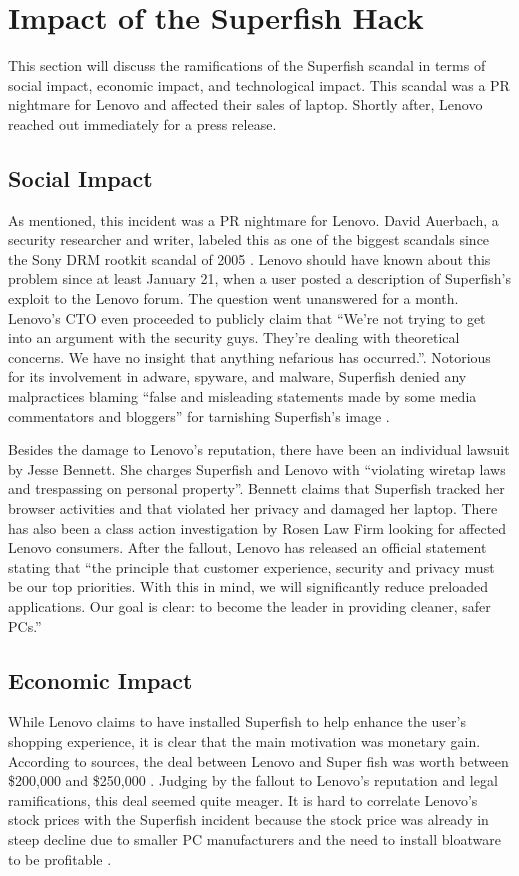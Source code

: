 \documentclass[journal]{IEEEtran}
\begin{document}
\section{Impact of the Superfish Hack}
This section will discuss the ramifications of the Superfish scandal in terms of social impact, economic impact, and technological impact. This scandal was a PR nightmare for Lenovo and affected their sales of laptop. Shortly after, Lenovo reached out immediately for a press release.

\subsection{Social Impact}
As mentioned, this incident was a PR nightmare for Lenovo. David Auerbach, a security researcher and writer, labeled this as one of the biggest scandals since the Sony DRM rootkit scandal of 2005 \cite{slate_lenovo}. Lenovo should have known about this problem since at least January 21, when a user posted a description of Superfish's exploit to the Lenovo forum. The question went unanswered for a month. Lenovo's CTO even proceeded to publicly claim that ``We’re not trying to get into an argument with the security guys. They’re dealing with theoretical concerns. We have no insight that anything nefarious has occurred.''\cite{slate_lenovo}. Notorious for its involvement in adware, spyware, and malware, Superfish denied any malpractices blaming ``false and misleading statements made by some media commentators and bloggers'' for tarnishing Superfish's image \cite{slate_lenovo}.

Besides the damage to Lenovo's reputation, there have been an individual lawsuit by Jesse Bennett. She charges Superfish and Lenovo with ``violating wiretap laws and trespassing on personal property''\cite{cnet_lenovo_lawsuit}. Bennett claims that Superfish tracked her browser activities and that violated her privacy and damaged her laptop. There has also been a class action investigation by Rosen Law Firm looking for affected Lenovo consumers. After the fallout, Lenovo has released an official statement stating that ``the principle that customer experience, security and privacy must be our top priorities. With this in mind, we will significantly reduce preloaded applications. Our goal is clear: to become the leader in providing cleaner, safer PCs.''

\subsection{Economic Impact}
While Lenovo claims to have installed Superfish to help enhance the user's shopping experience, it is clear that the main motivation was monetary gain. According to sources, the deal between Lenovo and Super fish was worth between \$200,000 and \$250,000 \cite{forbes_lenovo}. Judging by the fallout to Lenovo's reputation and legal ramifications, this deal seemed quite meager. It is hard to correlate Lenovo's stock prices with the Superfish incident because the stock price was already in steep decline due to smaller PC manufacturers and the need to install bloatware to be profitable \cite{dunn_2017}.
\end{document}
